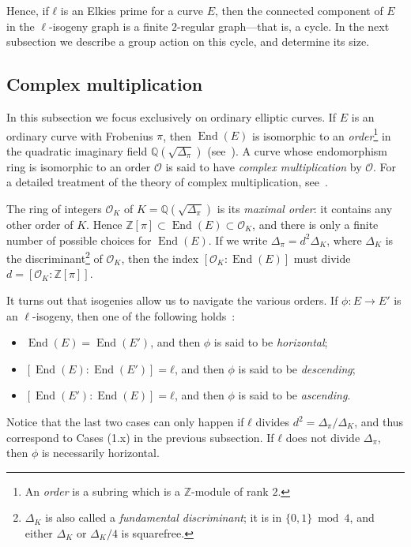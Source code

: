 \documentclass{llncs}
\renewcommand{\O}{\mathcal{O}}
\DeclareMathOperator{\End}{End}
\begin{document}
Hence, if $ℓ$ is an Elkies prime for a curve $E$,
then the connected component of $E$ in the $\ell$-isogeny graph 
is a finite $2$-regular graph---that is, a cycle. 
In the next subsection we describe a group action on this cycle,
and determine its size.


\subsection{Complex multiplication}

In this subsection we focus exclusively on ordinary elliptic curves. 
If $E$ is an ordinary curve with Frobenius $π$,
then $\End(E)$ is isomorphic to an
\emph{order}\footnote{%
    An \emph{order} is a subring which is a $ℤ$-module of rank $2$.
} in the quadratic imaginary field
$ℚ(\sqrt{Δ_π})$ (see~\cite[III.9]{silverman:elliptic}).
A curve whose endomorphism ring is isomorphic to an order $\O$ is said to
have \emph{complex multiplication} by $\O$.
For a detailed treatment of the theory of complex multiplication,
see~\cite{lang1987elliptic,silverman:advanced}.

The ring of integers $\O_K$ of $K=ℚ(\sqrt{Δ_π})$ is its
\emph{maximal order}: it contains any other order of $K$.  Hence
$ℤ[π]⊂\End(E)⊂\O_K$, and there is only a finite number of possible
choices for $\End(E)$. If we write $Δ_π=d^2Δ_K$, where $Δ_K$ is the
discriminant\footnote{$Δ_K$ is also called 
    a \emph{fundamental discriminant}; 
    it is in $\{0,1\}\bmod 4$, and either $Δ_K$ or $Δ_K/4$ is squarefree.
} 
of $\O_K$, then the index $[\O_K:\End(E)]$ must divide $d=[\O_K:ℤ[π]]$.


It turns out that isogenies allow us to navigate the various
orders. If $ϕ:E→E'$ is an $\ell$-isogeny, then one of the following
holds~\cite[Prop.~21]{kohel}:
\begin{itemize}
\item $\End(E) = \End(E')$, and then $ϕ$ is said to be
  \emph{horizontal};
\item $[\End(E):\End(E')] = ℓ$, and then $ϕ$ is said to be
  \emph{descending};
\item $[\End(E'):\End(E)] = ℓ$, and then $ϕ$ is said to be
  \emph{ascending}.
\end{itemize}
Notice that the last two cases can only happen if $ℓ$ divides
$d^2=Δ_π/Δ_K$, and thus correspond to Cases (1.x) in the previous
subsection.
If $ℓ$ does not divide $Δ_π$, then $ϕ$ is necessarily horizontal.
\end{document}
